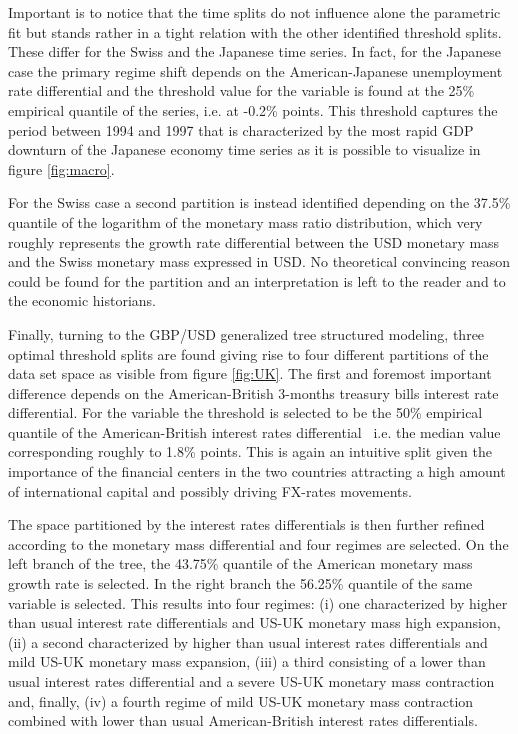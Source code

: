 Important is to notice that the time splits do not influence alone the
parametric fit but stands rather in a tight relation with the other
identified threshold splits. These differ for the Swiss and the
Japanese time series. In fact, for the Japanese case the primary
regime shift depends on the American-Japanese unemployment rate
differential and the threshold value for the variable is found at the
25\% empirical quantile of the series, i.e. at -0.2\% points. This
threshold captures the period between 1994 and 1997 that is
characterized by the most rapid GDP downturn of the Japanese economy
time series as it is possible to visualize in figure \ref{fig:macro}.

For the Swiss case a second partition is instead identified depending
on the 37.5\% quantile of the logarithm of the monetary mass ratio
distribution, which very roughly represents the growth rate
differential between the USD monetary mass and the Swiss monetary mass
expressed in USD. No theoretical convincing reason could be found for
the partition and an interpretation is left to the reader and to the
economic historians.

Finally, turning to the GBP/USD generalized tree structured modeling,
three optimal threshold splits are found giving rise to four different
partitions of the data set space as visible from figure \ref{fig:UK}.
The first and foremost important difference depends on the
American-British 3-months treasury bills interest rate
differential. For the variable the threshold is selected to be the
50\% empirical quantile of the American-British interest rates
differential \textendash \ i.e. the median value corresponding roughly
to 1.8\% points. This is again an intuitive split given the importance
of the financial centers in the two countries attracting a high amount
of international capital and possibly driving FX-rates movements.

The space partitioned by the interest rates differentials is then
further refined according to the monetary mass differential and four
regimes are selected. On the left branch of the tree, the 43.75\%
quantile of the American monetary mass growth rate is selected. In the
right branch the 56.25\% quantile of the same variable is
selected. This results into four regimes: (i) one characterized by
higher than usual interest rate differentials and US-UK monetary mass
high expansion, (ii) a second characterized by higher than usual
interest rates differentials and mild US-UK monetary mass expansion,
(iii) a third consisting of a lower than usual interest rates
differential and a severe US-UK monetary mass contraction and,
finally, (iv) a fourth regime of mild US-UK monetary mass contraction
combined with lower than usual American-British interest rates
differentials.

